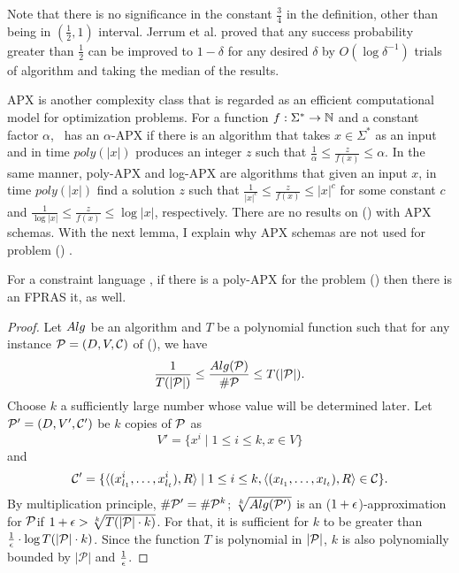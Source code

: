 Note that there is no significance in the constant \(\frac{3}{4}\) in the definition,
other than being in \((\frac{1}{2},1)\) interval. 
Jerrum et al. \cite{JVV} proved that any success probability 
greater than \(\frac{1}{2}\) can be improved to \(1-\delta\) for any desired \(\delta\) by
\(O(\log \delta^{-1})\) trials of algorithm and taking the median of the results.

APX is another complexity class that is regarded as an efficient computational model for
optimization problems.
For a function \(f:\Sigma^*\to\mathbb{N}\) and a constant factor \(\alpha\),
\mf\ has an \(\alpha\)-APX if there is an algorithm that
takes \(x\in\Sigma^*\) as an input and in time \(poly(|x|)\) produces an integer \(z\)
such that \(\frac{1}{\alpha}\le\frac{z}{f(x)}\le \alpha\). In the same manner,
poly-APX and log-APX are algorithms that given an input
\(x\), in time \(poly(|x|)\) find a solution \(z\) 
such that  \(\frac{1}{|x|^c}\le\frac{z}{f(x)}\le |x|^c\) for some constant \(c\) and
\(\frac{1}{\log |x|}\le\frac{z}{f(x)}\le \log |x|\), respectively.
There are no results on \ccsp(\mrelset) with
APX schemas. With the next lemma, I explain why APX schemas are not used for problem \ccsp(\mrelset) .

\begin{lemma}
For a constraint language \mrelset, if there is a poly-APX for
the problem \ccsp(\mrelset) then there is an FPRAS it, as well.
\end{lemma}

\begin{proof}
Let \(Alg\) be an algorithm and \(T\) be a polynomial function such
that for any instance \(\mathcal{P}=(D,V,\mathcal{C})\)
of \ccsp(\mrelset), we have 
\[\frac{1}{T(|\mathcal{P}|)} \le \frac{Alg(\mathcal{P})}{\#\mathcal{P}} \le T(|\mathcal{P}|).\]
Choose \(k\) a sufficiently large number whose value
will be determined later. Let \(\mathcal{P}'=(D, V',\mathcal{C}')\) be \(k\) copies of \(\mathcal{P}\) as
\[V'=\{x^i \mid 1 \le i \le k, x \in V\}\] and
\[\mathcal{C}'=\{\langle (x^i_{l_1},\dotsc, x^i_{l_t}), R \rangle \mid 1 \le i \le k,
\langle (x_{l_1},\dotsc, x_{l_t}), R \rangle \in \mathcal{C}\}.\]
By multiplication principle, \(\#\mathcal{P}'=\#\mathcal{P}^k\); \(\sqrt[k]{Alg(\mathcal{P}')}\) is 
an (\(1+\epsilon\))-approximation for \(\mathcal{P}\)\@ if \(1+\epsilon > \sqrt[k]{T(|\mathcal{P}|\cdot k)}\)\@.
For that, it is sufficient for \(k\) to be greater than
\(\frac{1}{\epsilon}\cdot \log T(|\mathcal{P}|\cdot k)\)\@.
Since the function \(T\) is polynomial in \(|\mathcal{P}|\), \(k\) is also polynomially 
bounded by \(|\mathcal{P}|\) and \(\frac{1}{\epsilon}\)\@.
\end{proof}


